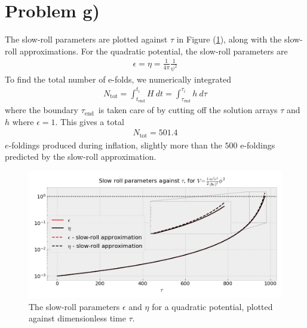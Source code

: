 \documentclass[reprint,english,notitlepage]{revtex4-1}  %
\numberwithin{equation}{section}
\begin{document}
\section{Problem g)}
The slow-roll parameters are plotted against $\tau$ in Figure
(\ref{fig:QuadraticPotential_slowroll-tau}), along with the slow-roll
approximations.
For the quadratic potential, the slow-roll parameters are
\begin{align}
	\epsilon = \eta = \frac{1}{4 \pi}\frac{1}{\psi^2}
\end{align}
To find the total number of e-folds, we  numerically integrated
\begin{align}
	N_{\mathrm{tot}} = \int_{t_{\mathrm{end}}}^{t_i} H\ dt = \int_{\tau_{\mathrm{end}}}^{\tau_i} h\ d\tau
\end{align}
where the boundary $\tau_{\mathrm{end}}$ is taken care of by cutting off the solution
arrays $\tau$ and $h$ where $\epsilon=1$. This gives a total
\begin{align}
	N_{\mathrm{tot}} = 501.4
\end{align}
$e$-foldings produced during inflation, slightly more than the $500$ e-foldings
predicted by the slow-roll approximation.
\begin{figure}[h!]
	\includegraphics[width=\linewidth]{QuadraticPotential_slowroll-tau.png}
	\caption{The slow-roll parameters $\epsilon$ and $\eta$ for a quadratic potential,
	plotted against dimensionless time $\tau$.}
	\label{fig:QuadraticPotential_slowroll-tau}
\end{figure}
\end{document}
